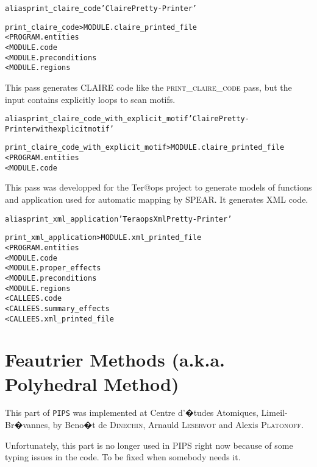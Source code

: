 \documentclass[a4paper]{report}
\newenvironment{PipsMake}{\begin{alltt}}{\end{alltt}}
\newenvironment{PipsPass}[1]{\label{pass:#1}}{}
\newcommand{\Pips}{\texttt{PIPS}}
\begin{document}
\begin{PipsMake}
alias print_claire_code 'Claire Pretty-Printer'

print_claire_code        > MODULE.claire_printed_file
        < PROGRAM.entities
        < MODULE.code
        < MODULE.preconditions
        < MODULE.regions
\end{PipsMake}


\begin{PipsPass}{print_claire_code_with_explicit_motif}
This pass generates CLAIRE code like the \textsc{print\_claire\_code}
pass, but the input contains explicitly loops to scan motifs.
\end{PipsPass}

\begin{PipsMake}
alias print_claire_code_with_explicit_motif 'Claire Pretty-Printer with explicit motif'

print_claire_code_with_explicit_motif       > MODULE.claire_printed_file
        < PROGRAM.entities
        < MODULE.code
\end{PipsMake}


\begin{PipsPass}{print_xml_application}
This pass was developped for the Ter@ops project to generate models
of functions and application used for automatic mapping by SPEAR.
It generates XML code.
\end{PipsPass}

\begin{PipsMake}
alias print_xml_application 'Teraops Xml Pretty-Printer'

print_xml_application      > MODULE.xml_printed_file
    < PROGRAM.entities
    < MODULE.code
    < MODULE.proper_effects
    < MODULE.preconditions
    < MODULE.regions
    < CALLEES.code
    < CALLEES.summary_effects
    < CALLEES.xml_printed_file
\end{PipsMake}

\chapter{Feautrier Methods (a.k.a. Polyhedral Method)}
\label{section-feautrier-methods}

This part of \Pips{} was implemented at Centre d'�tudes Atomiques,
Limeil-Br�vannes, by Beno�t de \textsc{Dinechin}, Arnauld
\textsc{Leservot} and Alexis \textsc{Platonoff}.

Unfortunately, this part is no longer used in PIPS right now because of
some typing issues in the code. To be fixed when somebody needs it.
\end{document}
